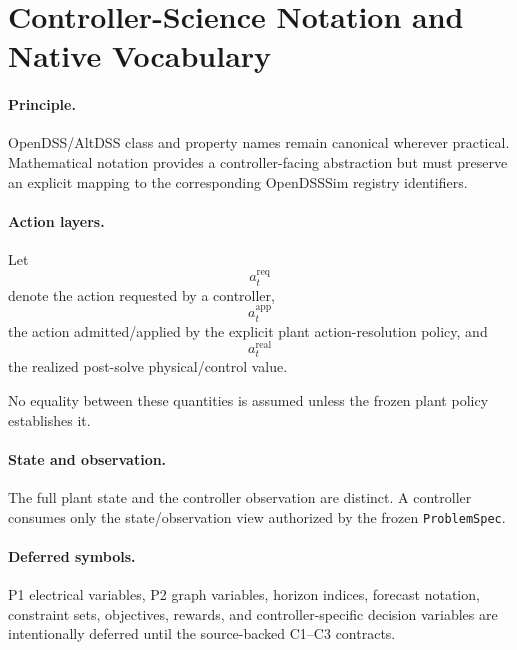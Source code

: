 
\section*{Controller-Science Notation and Native Vocabulary}

\paragraph{Principle.}
OpenDSS/AltDSS class and property names remain canonical wherever practical.
Mathematical notation provides a controller-facing abstraction but must preserve an
explicit mapping to the corresponding OpenDSSSim registry identifiers.

\paragraph{Action layers.}
Let
\[
  a^{\mathrm{req}}_t
\]
denote the action requested by a controller,
\[
  a^{\mathrm{app}}_t
\]
the action admitted/applied by the explicit plant action-resolution policy, and
\[
  a^{\mathrm{real}}_t
\]
the realized post-solve physical/control value.

No equality between these quantities is assumed unless the frozen plant policy establishes
it.

\paragraph{State and observation.}
The full plant state and the controller observation are distinct. A controller consumes
only the state/observation view authorized by the frozen \texttt{ProblemSpec}.

\paragraph{Deferred symbols.}
P1 electrical variables, P2 graph variables, horizon indices, forecast notation,
constraint sets, objectives, rewards, and controller-specific decision variables are
intentionally deferred until the source-backed C1--C3 contracts.
